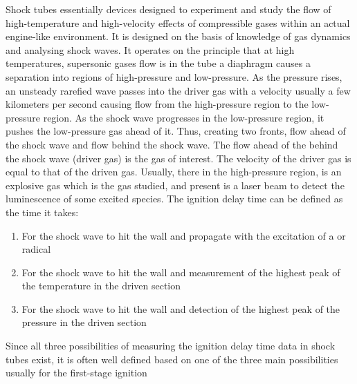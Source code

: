 Shock tubes essentially devices designed to experiment and study the flow of high-temperature and high-velocity effects of compressible gases within an actual engine-like environment. It is designed on the basis of knowledge of gas dynamics and analysing shock waves. It operates on the principle that at high temperatures, supersonic gases flow is in the tube a diaphragm causes a separation into regions of high-pressure and low-pressure. As the pressure rises, an unsteady rarefied wave passes into the driver gas with a velocity usually a few kilometers per second causing flow from the high-pressure region to the low-pressure region. As the shock wave progresses in the low-pressure region, it pushes the low-pressure gas ahead of it. Thus, creating two fronts, flow ahead of the shock wave and flow behind the shock wave. The flow ahead of the behind the shock wave (driver gas) is the gas of interest. The velocity of the driver gas is equal to  that of the driven gas\cite{Greene1964TheR.}. Usually, there in the high-pressure region, is an explosive gas which is the gas studied, and present is a laser beam to detect the luminescence of some excited species. The ignition delay time can be defined as the time it takes:
\begin{enumerate}
    \item For the shock wave to hit the wall and propagate with the excitation of a  or radical
    \item For the shock wave to hit the wall and measurement of the highest peak of the temperature in the driven section
    \item For the shock wave to hit the wall and detection of the highest peak of the pressure in the driven section
\end{enumerate}
Since all three possibilities of measuring the ignition delay time data in shock tubes exist, it is often well defined based on one of the three main possibilities usually for the first-stage ignition \cite{Davidson2004InterpretingData}\cite{Fieweger1994Shock-tubePressures}\cite{Fieweger1997Self-ignitionPressure}\cite{Pfahl1996Self-ignitionConditions}\cite{Haylett2012IgnitionTube}

